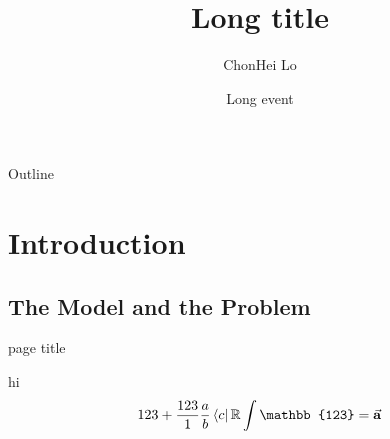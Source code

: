 \documentclass{beamer}
\title[Short title]{Long title}
\author[name]{ChonHei Lo\inst{1}}
\institute[PKU]{\inst{1}Peking University, China}
\date[short event]{Long event}
\begin{document}
\begin{frame}
  \titlepage
\end{frame}

\begin{frame}{Outline}
  \tableofcontents
\end{frame}

\section{Introduction}

\subsection{The Model and the Problem}

\begin{frame}{page title}
    \begin{block}{hi}
        $$123 + \frac{123}{1}\frac{a}{b}\bra{c} \mathbb{R} \int{\mathbb{123}} = \va{a} $$
    \end{block}
\end{frame}
\end{document}
